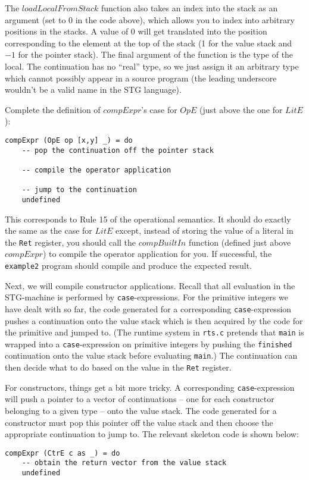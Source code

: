 \documentclass[10pt,a4paper]{exam} %
\begin{document}
\begin{questions}
The $\mathit{loadLocalFromStack}$ function also takes an index into the stack as an argument (set to 0 in the code above), which allows you to index into arbitrary positions in the stacks. A value of $0$ will get translated into the position corresponding to the element at the top of the stack (1 for the value stack and $-1$ for the pointer stack). The final argument of the function is the type of the local. The continuation has no ``real'' type, so we just assign it an arbitrary type which cannot possibly appear in a source program (the leading underscore wouldn't be a valid name in the STG language).

\question Complete the definition of $\mathit{compExpr}$'s case for $\mathit{OpE}$ (just above the one for $\mathit{LitE}$):
\begin{verbatim}
compExpr (OpE op [x,y] _) = do
    -- pop the continuation off the pointer stack

    -- compile the operator application

    -- jump to the continuation
    undefined
\end{verbatim}
This corresponds to Rule 15 of the operational semantics. It should do exactly the same as the case for $\mathit{LitE}$ except, instead of storing the value of a literal in the \texttt{Ret} register, you should call the $\mathit{compBuiltIn}$ function (defined just above $\mathit{compExpr}$) to compile the operator application for you. If successful, the \texttt{example2} program should compile and produce the expected result.

\question Next, we will compile constructor applications. Recall that all evaluation in the STG-machine is performed by \texttt{case}-expressions. For the primitive integers we have dealt with so far, the code generated for a corresponding \texttt{case}-expression pushes a continuation onto the value stack which is then acquired by the code for the primitive and jumped to. (The runtime system in \texttt{rts.c} pretends that \texttt{main} is wrapped into a \texttt{case}-expression on primitive integers by pushing the \texttt{finished} continuation onto the value stack before evaluating \texttt{main}.) The continuation can then decide what to do based on the value in the \texttt{Ret} register.

For constructors, things get a bit more tricky. A corresponding \texttt{case}-expression will push a pointer to a vector of continuations -- one for each constructor belonging to a given type -- onto the value stack. The code generated for a constructor must pop this pointer off the value stack and then choose the appropriate continuation to jump to. The relevant skeleton code is shown below:
\begin{verbatim}
compExpr (CtrE c as _) = do
    -- obtain the return vector from the value stack
    undefined


\end{verbatim}
\end{questions}
\end{document}
